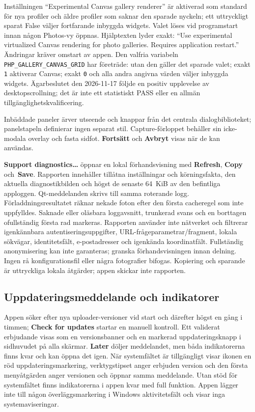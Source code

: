 \documentclass[11pt,a4paper]{article}
\newcommand{\ui}[1]{\textbf{#1}}
\newcommand{\codeword}[1]{\nolinkurl{#1}}
\begin{document}
Inställningen “Experimental Canvas gallery renderer” är aktiverad som standard
för nya profiler och äldre profiler som saknar den sparade nyckeln; ett uttryckligt
sparat False väljer fortfarande inbyggda widgets. Valet löses vid programstart
innan någon Photos-vy öppnas. Hjälptexten lyder exakt:
“Use experimental virtualized Canvas rendering for photo galleries.
Requires application restart.” Ändringar kräver omstart av appen. Den valfria
variabeln \codeword{PHP_GALLERY_CANVAS_GRID} har företräde: utan den gäller det
sparade valet; exakt \codeword{1} aktiverar Canvas; exakt \codeword{0} och alla
andra angivna värden väljer inbyggda widgets. Ägarbeslutet den 2026-11-17 följde
en positiv upplevelse av desktopscrollning; det är inte ett statistiskt PASS
eller en allmän tillgänglighetskvalificering.

Inbäddade paneler ärver utseende och knappar från det centrala dialogbiblioteket;
panelstapeln definierar ingen separat stil. Capture-förloppet behåller sin
icke-modala overlay och fasta sidfot. \ui{Fortsätt} och \ui{Avbryt} visas när
de kan användas.

\ui{Support diagnostics…} öppnar en lokal förhandsvisning med \ui{Refresh},
\ui{Copy} och~\ui{Save}. Rapporten innehåller tillåtna inställningar och
körningsfakta, den aktuella diagnostikbilden och högst de senaste 64~KiB av
den befintliga apploggen. Qt-meddelanden skrivs till samma roterande logg.
Förladdningsresultatet räknar nekade foton efter den första cacheregel som
inte uppfylldes.
Saknade eller oläsbara loggavsnitt, trunkerad svans
och en borttagen ofullständig första rad markeras. Rapporten
använder inte nätverket och filtrerar igenkännbara
autentiseringsuppgifter, URL-frågeparametrar/fragment, lokala sökvägar,
identitetsfält, e-postadresser och igenkända koordinatfält. Fullständig
anonymisering kan inte garanteras; granska förhandsvisningen innan delning.
Ingen rå konfigurationsfil eller några fotografier bifogas. Kopiering och
sparande är uttryckliga lokala åtgärder; appen skickar inte rapporten.

\subsection{Uppdateringsmeddelande och indikatorer}

Appen söker efter nya uploader-versioner vid start och därefter högst en gång
i timmen; \ui{Check for updates} startar en manuell kontroll. Ett validerat
erbjudande visas som en versionsbanner och en markerad uppdateringsknapp i
sidhuvudet på alla skärmar. \ui{Later} döljer meddelandet, men båda
indikatorerna
finns kvar och kan öppna det igen. När systemfältet är tillgängligt visar ikonen
en röd uppdateringsmarkering, verktygstipset anger erbjuden version och den
första menyåtgärden anger versionen och öppnar samma meddelande. Utan stöd för
systemfältet finns indikatorerna i appen kvar med full funktion. Appen lägger
inte till någon överläggsmarkering i Windows aktivitetsfält och visar inga
systemaviseringar.
\end{document}
